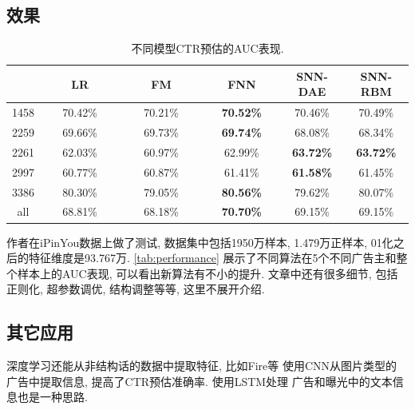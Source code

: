 \documentclass{ctexart}
\begin{document}
\subsection{效果}
\begin{table}[t]
\centering
\caption{不同模型CTR预估的AUC表现.}\label{tab:performance}
\begin{tabular}{c|ccccc}
& ~~~~LR~~~~ & ~~~~FM~~~~ & ~~~FNN~~~ & SNN-DAE & SNN-RBM\\ \hline
1458 & 70.42\% & 70.21\% & \textbf{70.52\%} & 70.46\% & 70.49\% \\
2259 & 69.66\% & 69.73\% & \textbf{69.74\%} & 68.08\% & 68.34\% \\
2261 & 62.03\% & 60.97\% & 62.99\% & \textbf{63.72\%} & \textbf{63.72\%} \\
2997 & 60.77\% & 60.87\% & 61.41\% & \textbf{61.58\%} & 61.45\% \\
3386 & 80.30\% & 79.05\% & \textbf{80.56\%} & 79.62\% & 80.07\% \\
all  & 68.81\% & 68.18\% & \textbf{70.70\%} & 69.15\% & 69.15\% \\
\end{tabular}
\end{table}

作者在iPinYou\cite{liao2014ipinyou}数据上做了测试, 数据集中包括1950万样本,
1.479万正样本, 01化之后的特征维度是93.767万. \autoref{tab:performance}
展示了不同算法在5个不同广告主和整个样本上的AUC表现, 可以看出新算法有不小的提升.
文章中还有很多细节, 包括正则化, 超参数调优, 结构调整等等, 这里不展开介绍.

\subsection{其它应用}
深度学习还能从非结构话的数据中提取特征,
比如Fire等\cite{fire2015exploring} 使用CNN从图片类型的
广告中提取信息, 提高了CTR预估准确率. 使用LSTM处理
广告和曝光中的文本信息也是一种思路.

\printbibliography
\end{document}
